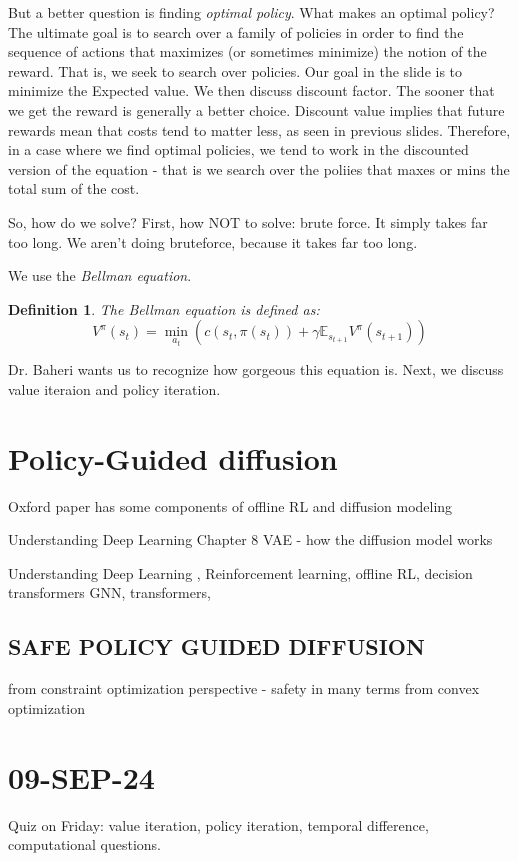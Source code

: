 \documentclass[10pt, oneside]{article}
\newtheorem{defn}{Definition}
\theoremstyle{definition}
\begin{document}
But a better question is finding \textit{optimal policy}. What makes an optimal policy? The ultimate goal is to search over a family of policies in order to find the sequence of actions that maximizes (or sometimes minimize) the notion of the reward. That is, we seek to search over policies. Our goal in the slide is to minimize the Expected value. We then discuss discount factor. The sooner that we get the reward is generally a better choice. Discount value implies that future rewards mean that costs tend to matter less, as seen in previous slides. Therefore, in a case where we find optimal policies, we tend to work in the discounted version of the equation - that is we search over the poliies that maxes or mins the total sum of the cost.

So, how do we solve?
First, how NOT to solve: brute force. It simply takes far too long. We aren't doing bruteforce, because it takes far too long. 

We use the \textit{Bellman equation}.
\begin{defn}
    The Bellman equation is defined as:
    \[V^{\pi}(s_t) = \min_{a_t}(c(s_t, \pi(s_t)) + \gamma \mathbb{E}_{s_{t+1}} V^\pi(s_{t+1}))\]
    
\end{defn}
Dr. Baheri wants us to recognize how gorgeous this equation is. Next, we discuss value iteraion and policy iteration.

\section{Policy-Guided diffusion}
Oxford paper has some components of offline RL and diffusion modeling 

Understanding Deep Learning Chapter 8 
VAE - how the diffusion model works 

Understanding Deep Learning , Reinforcement learning, offline RL, decision transformers GNN, transformers, 

\subsection{SAFE POLICY GUIDED DIFFUSION}
from constraint optimization perspective - safety in many terms from convex optimization

\section{09-SEP-24}
Quiz on Friday: value iteration, policy iteration, temporal difference, computational questions. 
\end{document}
